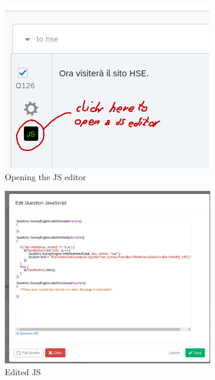 \documentclass[fleqn]{article}
\begin{document}
\begin{figure} [h]
     \centering
     \hfill
     \begin{subfigure}[c]{0.3\textwidth}
         \centering
         \includegraphics[width=\textwidth]{img/qsl1}
         \caption{Opening the JS editor}
         \label{fig:qsl1}
     \end{subfigure}
     \hfill
     \begin{subfigure}[c]{0.35\textwidth}
         \centering
         \includegraphics[width=\textwidth]{img/qsl2}
         \caption{Edited JS}
         \label{fig:qsl2}
     \end{subfigure}
     \hfill
     \caption{}
     \label{fig:qualtricsLinkJs}
\end{figure}
\end{document}

